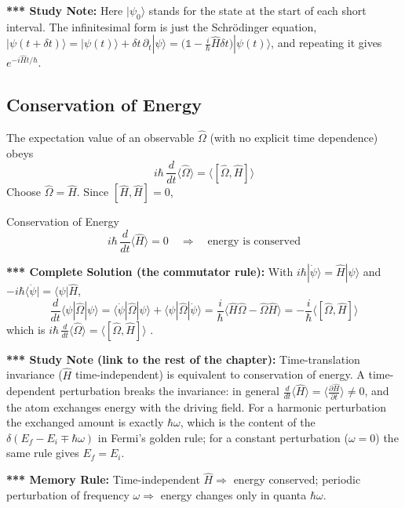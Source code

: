 \documentclass[11pt,a4paper]{article}
\begin{document}
\textbf{*** Study Note:} Here $|\psi_0\rangle$ stands for the state at the start of each short interval. The infinitesimal form is just the Schr\"odinger equation, $|\psi(t+\delta t)\rangle=|\psi(t)\rangle+\delta t\,\partial_t|\psi\rangle=\big(\mathbb 1-\frac i\hbar\hat H\delta t\big)|\psi(t)\rangle$, and repeating it gives $e^{-i\hat Ht/\hbar}$.

\subsection{Conservation of Energy}
The expectation value of an observable $\hat\Omega$ (with no explicit time dependence) obeys
\[
i\hbar\,\frac d{dt}\langle\hat\Omega\rangle=\big\langle[\hat\Omega,\hat H]\big\rangle
\]
Choose $\hat\Omega=\hat H$. Since $[\hat H,\hat H]=0$,
\begin{thm}{Conservation of Energy}
\[
i\hbar\,\frac d{dt}\langle\hat H\rangle=0\quad\Longrightarrow\quad\text{energy is conserved}
\]
\end{thm}

\textbf{*** Complete Solution (the commutator rule):} With $i\hbar|\dot\psi\rangle=\hat H|\psi\rangle$ and $-i\hbar\langle\dot\psi|=\langle\psi|\hat H$,
\[
\frac d{dt}\langle\psi|\hat\Omega|\psi\rangle=\langle\dot\psi|\hat\Omega|\psi\rangle+\langle\psi|\hat\Omega|\dot\psi\rangle=\frac i\hbar\langle\hat H\hat\Omega-\hat\Omega\hat H\rangle=-\frac i\hbar\langle[\hat\Omega,\hat H]\rangle
\]
which is $i\hbar\,\frac d{dt}\langle\hat\Omega\rangle=\langle[\hat\Omega,\hat H]\rangle$ \checkmark.

\textbf{*** Study Note (link to the rest of the chapter):} Time-translation invariance ($\hat H$ time-independent) is equivalent to conservation of energy. A time-dependent perturbation breaks the invariance: in general $\frac d{dt}\langle\hat H\rangle=\big\langle\frac{\partial\hat H}{\partial t}\big\rangle\neq0$, and the atom exchanges energy with the driving field. For a harmonic perturbation the exchanged amount is exactly $\hbar\omega$, which is the content of the $\delta(E_f-E_i\mp\hbar\omega)$ in Fermi's golden rule; for a constant perturbation ($\omega=0$) the same rule gives $E_f=E_i$.

\textbf{*** Memory Rule:} Time-independent $\hat H\Rightarrow$ energy conserved; periodic perturbation of frequency $\omega\Rightarrow$ energy changes only in quanta $\hbar\omega$.
\end{document}
